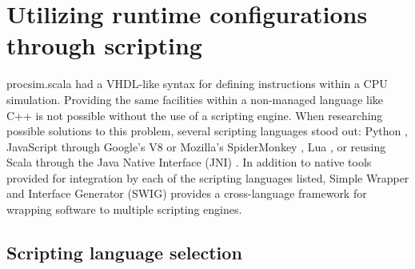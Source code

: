 \section{Utilizing runtime configurations through scripting}

procsim.scala had a VHDL-like syntax for defining instructions within a CPU simulation. Providing the same facilities within a non-managed language like C++ is not possible without the use of a scripting engine. When researching possible solutions to this problem, several scripting languages stood out: Python \cite{Python:Homepage}, JavaScript through Google's V8 \cite{Google:V8} or Mozilla's SpiderMonkey \cite{MDN:SpiderMonkey}, Lua \cite{Lua:Homepage}, or reusing Scala through the Java Native Interface (JNI) \cite{Oracle:JNI}. In addition to native tools provided for integration by each of the scripting languages listed, Simple Wrapper and Interface Generator (SWIG) \cite{SWIG:Homepage} provides a cross-language framework for wrapping software to multiple scripting engines. 


\subsection{Scripting language selection}


